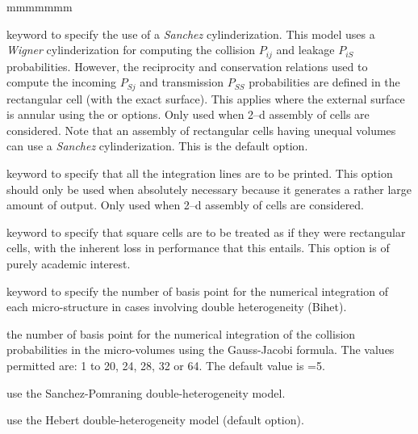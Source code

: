 \begin{ListeDeDescription}{mmmmmmm}
\item[\moc{SANC}] keyword to specify the use of a {\sl Sanchez} cylinderization.
This model uses a {\sl Wigner} cylinderization for computing the collision $P_{ij}$
and leakage $P_{iS}$ probabilities. However, the reciprocity and conservation
relations used to compute the incoming $P_{Sj}$ and transmission $P_{SS}$
probabilities are defined in the rectangular cell (with the exact
surface).\cite{SANCHEZ} 
This applies where the external surface is annular using the  or
 options. Only used when 2--d assembly of cells are considered. Note
that an assembly of rectangular cells having unequal volumes can use a
{\sl Sanchez} cylinderization. This is the default option.

\item[\moc{LIGN}] keyword to specify that all the integration lines are to be
printed. This option should only be used when absolutely necessary because it
generates a rather large amount of output. Only used when 2--d assembly of cells
are considered.

\item[\moc{RECT}] keyword to specify that square cells are to be treated as if
they were rectangular cells, with the inherent loss in performance that this
entails. This option is of purely academic interest.

\item[\moc{QUAB}] keyword to specify the number of basis point for the
numerical integration of each micro-structure in cases involving double
heterogeneity (Bihet).

\item[\dusa{iquab}] the number of basis point for the numerical integration of
the collision probabilities in the micro-volumes using the  Gauss-Jacobi
formula. The values permitted are: 1 to 20, 24, 28, 32 or  64. The default value
is =5.

\item[\moc{SAPO}] use the Sanchez-Pomraning double-heterogeneity model.\cite{sapo}

\item[\moc{HEBE}] use the Hebert double-heterogeneity model (default option).\cite{BIHET}

\end{ListeDeDescription}
\eject
